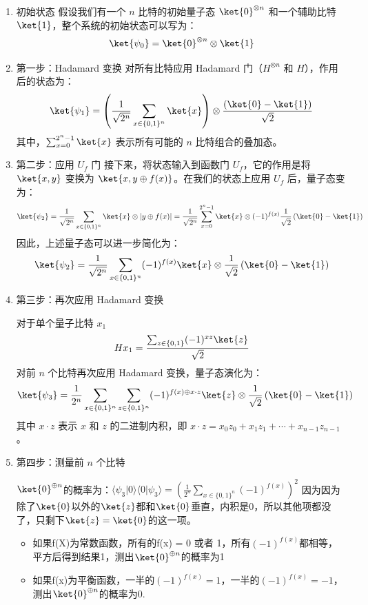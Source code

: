 \documentclass[11pt]{article}
\begin{document}
\begin{enumerate}
    \item 初始状态
    假设我们有一个 $n$ 比特的初始量子态 $\ket{0}^{\otimes n}$ 和一个辅助比特 $\ket{1}$，整个系统的初始状态可以写为：
    \[
    \ket{\psi_0} = \ket{0}^{\otimes n} \otimes \ket{1}
    \]
    \item 第一步：Hadamard 变换
    对所有比特应用 Hadamard 门（$H^{\otimes n}$ 和 $H$），作用后的状态为：
    \[
    \ket{\psi_1} = \left( \frac{1}{\sqrt{2^n}} \sum_{x \in \{0,1\}^n}\ket{x} \right) \otimes \frac{\left( \ket{0} - \ket{1} \right)}{\sqrt{2}} 
    \]
    其中，$\sum_{x=0}^{2^n-1} \ket{x}$ 表示所有可能的 $n$ 比特组合的叠加态。
    \item 第二步：应用 $U_f$ 门
    接下来，将状态输入到函数门 $U_f$，它的作用是将 $\ket{x, y}$ 变换为 $\ket{x, y \oplus f(x)}$。在我们的状态上应用 $U_f$ 后，量子态变为：
    \[
    \ket{\psi_2} = \frac{1}{\sqrt{2^n}} \sum_{x \in \{0,1\}^n} \ket{x} \otimes |y \oplus f(x)| = \frac{1}{\sqrt{2^n}} \sum_{x=0}^{2^n-1} \ket{x} \otimes (-1)^{f(x)} \frac{1}{\sqrt2} \left( \ket{0} - \ket{1} \right)
    \]
    因此，上述量子态可以进一步简化为：
    \[
    \ket{\psi_2} = \frac{1}{\sqrt{2^n}} \sum_{x \in \{0,1\}^n} (-1)^{f(x)} \ket{x} \otimes \frac{1}{\sqrt{2}} \left( \ket{0} - \ket{1} \right)
    \]
    \item 第三步：再次应用 Hadamard 变换
    
    对于单个量子比特 $x_1$
    \[
        H x_1 = \frac{\sum_{z \in \{0,1\}} (-1)^{xz} \ket{z}}{\sqrt2}
    \]
    对前 $n$ 个比特再次应用 Hadamard 变换，量子态演化为：
    \[
    \ket{\psi_3} = \frac{1}{2^n} \sum_{x \in \{0,1\}^n} \sum_{z \in \{0,1\}^n} (-1)^{f(x) \oplus x \cdot z} \ket{z} \otimes \frac{1}{\sqrt{2}} \left( \ket{0} - \ket{1} \right)
    \]
    其中 $x \cdot z$ 表示 $x$ 和 $z$ 的二进制内积，即 $x \cdot z = x_0z_0 + x_1z_1 + \cdots + x_{n-1}z_{n-1}$。

    \item 第四步：测量前 $n$ 个比特

    $\ket{0} ^{\oplus n}$的概率为：$\langle \psi_3 | 0 \rangle \langle 0 | \psi_3\rangle = (\frac{1}{2^n} \sum_{x \in \{0,1\}^n}  (-1)^{f(x)})^2$
    因为因为除了$\ket{0}$以外的$\ket{z}$都和$\ket{0}$垂直，内积是0，所以其他项都没了，只剩下$\ket{z} = \ket{0}$的这一项。
    \begin{itemize}
        \item 如果f(X)为常数函数，所有的f(x) = 0 或者 1，所有$(-1)^{f(x)}$都相等，平方后得到结果1，测出$\ket{0} ^{\oplus n}$的概率为1
        \item 如果f(x)为平衡函数，一半的$(-1)^{f(x)} = 1$，一半的$(-1)^{f(x)} = -1$，测出$\ket{0} ^{\oplus n}$的概率为0.
    \end{itemize}
    

\end{enumerate}
\end{document}

